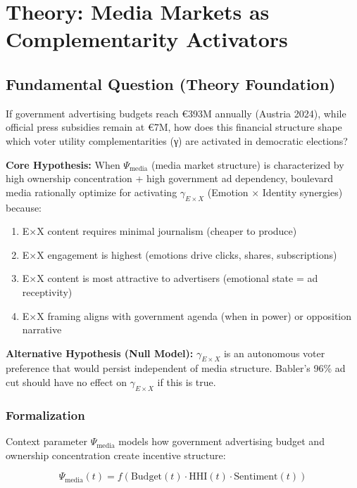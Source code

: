 \section{Theory: Media Markets as Complementarity Activators}
\label{sec:dx-theory}

\subsection{Fundamental Question (Theory Foundation)}

If government advertising budgets reach €393M annually (Austria 2024), while
official press subsidies remain at €7M, how does this financial structure shape
which voter utility complementarities (γ) are activated in democratic elections?

\textbf{Core Hypothesis:} When $\Psi_{\text{media}}$ (media market structure) is
characterized by high ownership concentration + high government ad dependency,
boulevard media rationally optimize for activating $\gamma_{E \times X}$ (Emotion
× Identity synergies) because:

\begin{enumerate}
\item E×X content requires minimal journalism (cheaper to produce)
\item E×X engagement is highest (emotions drive clicks, shares, subscriptions)
\item E×X content is most attractive to advertisers (emotional state = ad receptivity)
\item E×X framing aligns with government agenda (when in power) or opposition narrative
\end{enumerate}

\textbf{Alternative Hypothesis (Null Model):} $\gamma_{E \times X}$ is an
autonomous voter preference that would persist independent of media structure.
Babler's 96\% ad cut should have no effect on $\gamma_{E \times X}$ if this is true.

\subsubsection*{Formalization}

Context parameter $\Psi_{\text{media}}$ models how government advertising budget
and ownership concentration create incentive structure:

\[
\Psi_{\text{media}}(t) = f\left(
  \text{Budget}(t) \cdot \text{HHI}(t) \cdot \text{Sentiment}(t)
\right)
\]

